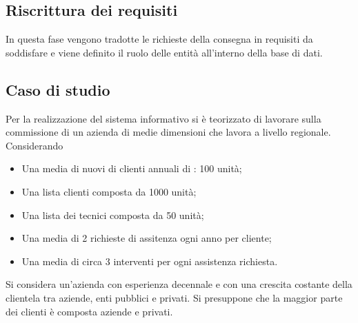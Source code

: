 \documentclass[legalpaper]{article}
\begin{document}
\subsection{Riscrittura dei requisiti}
In questa fase vengono tradotte le richieste della consegna in requisiti da soddisfare e viene definito il ruolo delle entità all’interno della base di dati.

\subsection{Caso di studio}
Per la realizzazione del sistema informativo si è teorizzato di lavorare sulla commissione di un azienda di medie dimensioni che lavora a livello regionale. \\ Considerando
\begin{itemize}
    \item Una media di nuovi di clienti annuali di : 100 unità;
    \item Una lista clienti composta da 1000 unità;
    \item Una lista dei tecnici composta da 50 unità;
    \item Una media di 2 richieste di assitenza ogni anno per cliente;
    \item Una media di circa 3 interventi per ogni assistenza richiesta.
\end{itemize}
Si considera un'azienda con esperienza decennale e con una crescita costante della clientela tra aziende, enti pubblici e privati.  Si presuppone che la maggior parte dei clienti è composta aziende e privati.
\end{document}
